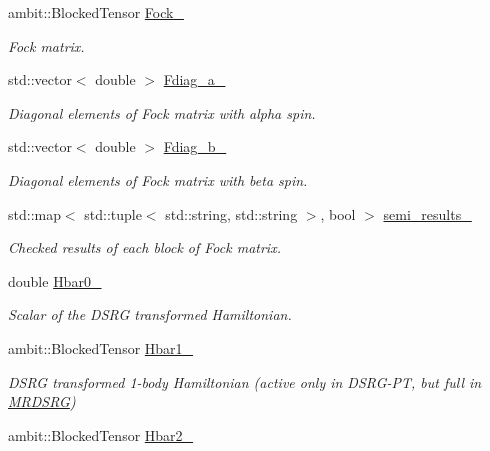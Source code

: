 \begin{DoxyCompactItemize}
ambit\+::\+Blocked\+Tensor \mbox{\hyperlink{classforte_1_1_m_a_s_t_e_r___d_s_r_g_a9debec93d23ab852d088ff360ddceb86}{Fock\+\_\+}}
\begin{DoxyCompactList}\small\item\em Fock matrix. \end{DoxyCompactList}\item 
std\+::vector$<$ double $>$ \mbox{\hyperlink{classforte_1_1_m_a_s_t_e_r___d_s_r_g_adc7ea1f1ba43e47a2281e8f08c578ec5}{Fdiag\+\_\+a\+\_\+}}
\begin{DoxyCompactList}\small\item\em Diagonal elements of Fock matrix with alpha spin. \end{DoxyCompactList}\item 
std\+::vector$<$ double $>$ \mbox{\hyperlink{classforte_1_1_m_a_s_t_e_r___d_s_r_g_ae29f5d6137cd34bead652317b2e7bec1}{Fdiag\+\_\+b\+\_\+}}
\begin{DoxyCompactList}\small\item\em Diagonal elements of Fock matrix with beta spin. \end{DoxyCompactList}\item 
std\+::map$<$ std\+::tuple$<$ std\+::string, std\+::string $>$, bool $>$ \mbox{\hyperlink{classforte_1_1_m_a_s_t_e_r___d_s_r_g_a7161b56b4c3ebe1c0fcc1f631ed5188c}{semi\+\_\+results\+\_\+}}
\begin{DoxyCompactList}\small\item\em Checked results of each block of Fock matrix. \end{DoxyCompactList}\item 
double \mbox{\hyperlink{classforte_1_1_m_a_s_t_e_r___d_s_r_g_afacebcde2f6345a80b53879bf323967a}{Hbar0\+\_\+}}
\begin{DoxyCompactList}\small\item\em Scalar of the D\+S\+RG transformed Hamiltonian. \end{DoxyCompactList}\item 
ambit\+::\+Blocked\+Tensor \mbox{\hyperlink{classforte_1_1_m_a_s_t_e_r___d_s_r_g_a703c90225c9d68ecb23ddda8b2d922a2}{Hbar1\+\_\+}}
\begin{DoxyCompactList}\small\item\em D\+S\+RG transformed 1-\/body Hamiltonian (active only in D\+S\+R\+G-\/\+PT, but full in \mbox{\hyperlink{classforte_1_1_m_r_d_s_r_g}{M\+R\+D\+S\+RG}}) \end{DoxyCompactList}\item 
ambit\+::\+Blocked\+Tensor \mbox{\hyperlink{classforte_1_1_m_a_s_t_e_r___d_s_r_g_a780ea9a89253b8daf7fc6ae7aa8ec774}{Hbar2\+\_\+}}

\end{DoxyCompactItemize}

